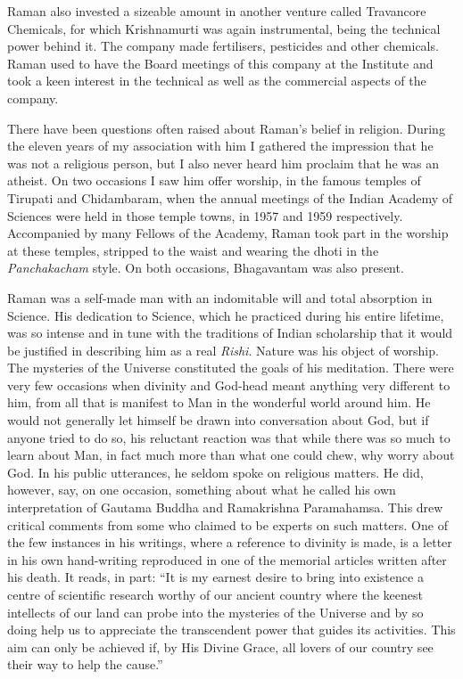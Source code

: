 Raman also invested a sizeable amount in another venture called Travancore Chemicals, for which Krishnamurti was again instrumental, being the technical power behind it. The company made fertilisers, pesticides and other chemicals. Raman used to have the Board meetings of this company at the Institute and took a keen interest in the technical as well as the commercial aspects of the company.

\medskip
{}
\smallskip


\noindent
There have been questions often raised about Raman's belief in religion. During the eleven years of my association with him I gathered the impression that he was not a religious person, but I also never heard him proclaim that he was an atheist. On two occasions I saw him offer worship, in the famous temples of Tirupati and Chidambaram, when the annual meetings of the Indian Academy of Sciences were held in those temple towns, in 1957 and 1959 respectively. Accompanied by many Fellows of the Academy, Raman took part in the worship at these temples, stripped to the waist and wearing the dhoti in the {\em Panchakacham} style. On both occasions, Bhagavantam was also present.

Raman was a self-made man with an indomitable will and total absorption in Science. His dedication to Science, which he practiced during his entire lifetime, was so intense and in tune with the traditions of Indian scholarship that it would be justified in describing him as a real {\em Rishi}. Nature was his object of worship. The mysteries of the Universe constituted the goals of his meditation. There were very few occasions when divinity and God-head meant anything very different to him, from all that is manifest to Man in the wonderful world around him. He would not generally let himself be drawn into conversation about God, but if anyone tried to do so, his reluctant reaction was that while there was so much to learn about Man, in fact much more than what one could chew, why worry about God. In his public utterances, he seldom spoke on religious matters. He did, however, say, on one occasion, something about what he called his own interpretation of Gautama Buddha and Ramakrishna Paramahamsa. This drew critical comments from some who claimed to be experts on such matters. One of the few instances in his writings, where a reference to divinity is made, is a letter in his own hand-writing reproduced in one of the memorial articles written after his death. It reads, in part: ``It is my earnest desire to bring into existence a centre of scientific research worthy of our ancient country where the keenest intellects of our land can probe into the mysteries of the Universe and by so doing help us to appreciate the transcendent power that guides its activities. This aim can only be achieved if, by His Divine Grace, all lovers of our country see their way to help the cause.''

